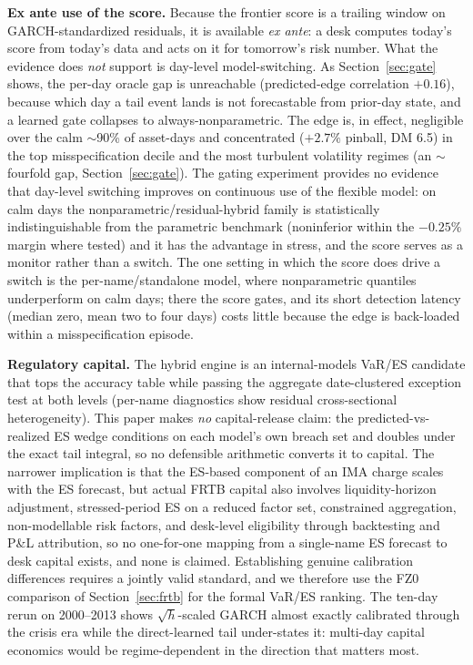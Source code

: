 \documentclass[11pt]{article}
\theoremstyle{remark}
\begin{document}
\medskip
\textbf{Ex ante use of the score.} Because the frontier score is a trailing window on
GARCH-standardized residuals, it is available \emph{ex ante}: a desk
computes today's score from today's data and acts on it for tomorrow's
risk number. What the evidence does \emph{not} support is day-level
model-switching. As Section~\ref{sec:gate} shows, the per-day oracle gap
is unreachable (predicted-edge correlation $+0.16$), because which day a
tail event lands is not forecastable from prior-day state, and a learned
gate collapses to always-nonparametric. The edge is, in effect,
negligible over the calm $\sim$90\% of asset-days and concentrated
($+2.7\%$ pinball, DM 6.5) in the top misspecification decile and the
most turbulent volatility regimes (an $\sim$fourfold gap,
Section~\ref{sec:gate}). The gating experiment provides no evidence
that day-level switching improves on continuous use of the flexible
model: on calm days the nonparametric/residual-hybrid family is
statistically indistinguishable from the parametric benchmark
(noninferior within the $-0.25\%$ margin where tested) and it has the
advantage in stress, and the score serves as a monitor rather than a
switch. The
one setting in which the score does drive a switch is the
per-name/standalone model, where nonparametric quantiles underperform on
calm days; there the score gates, and its short detection latency
(median zero, mean two to four days) costs little because the edge is
back-loaded within a misspecification episode.

\textbf{Regulatory capital.} The
hybrid engine is an internal-models VaR/ES candidate that tops the
accuracy table while passing the aggregate date-clustered exception
test at both levels (per-name diagnostics show residual
cross-sectional heterogeneity). This paper makes \emph{no}
capital-release claim: the predicted-vs-realized ES wedge conditions
on each model's own breach set and doubles under the exact tail
integral, so no defensible arithmetic converts it to capital. The narrower implication is that the ES-based component
of an IMA charge scales with the ES forecast, but actual FRTB capital
also involves liquidity-horizon adjustment, stressed-period ES on a
reduced factor set, constrained aggregation, non-modellable risk
factors, and desk-level eligibility through backtesting and P\&L attribution, so no one-for-one mapping from a single-name ES
forecast to desk capital exists, and none is claimed. Establishing
genuine calibration differences requires a jointly valid standard,
and we therefore use the FZ0 comparison of Section~\ref{sec:frtb} for the
formal VaR/ES ranking. The ten-day rerun on
2000--2013 shows $\sqrt{h}$-scaled GARCH almost exactly calibrated
through the crisis era while the direct-learned tail under-states it:
multi-day capital economics would be regime-dependent in the direction
that matters most.
\end{document}

